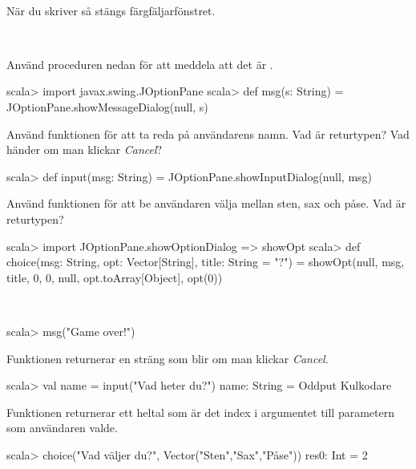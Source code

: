 \TaskSolved \what~\\När du skriver  så stängs färgfäljarfönstret.

\QUESTEND



\QUESTBEGIN

\Task\Uberkurs \what~

\Subtask Använd proceduren  nedan för att meddela att det är .
\begin{REPL}
scala> import javax.swing.JOptionPane
scala> def msg(s: String) = JOptionPane.showMessageDialog(null, s)
\end{REPL}

\Subtask Använd funktionen  för att ta reda på användarens namn. Vad är returtypen? Vad händer om man klickar \emph{Cancel}?
\begin{REPL}
scala> def input(msg: String) = JOptionPane.showInputDialog(null, msg)
\end{REPL}

\Subtask Använd funktionen  för att be användaren välja mellan sten, sax och påse. Vad är returtypen?
\begin{REPL}
scala> import JOptionPane.{showOptionDialog => showOpt}
scala> def choice(msg: String, opt: Vector[String], title: String = "?") =
  showOpt(null, msg, title, 0, 0, null, opt.toArray[Object], opt(0))
\end{REPL}


\SOLUTION

\TaskSolved \what~

\SubtaskSolved
\begin{REPL}
scala> msg("Game over!")
\end{REPL}

\SubtaskSolved Funktionen  returnerar en sträng som blir  om man klickar \emph{Cancel}.
\begin{REPL}
scala> val name = input("Vad heter du?")
name: String = Oddput Kulkodare
\end{REPL}

\SubtaskSolved Funktionen  returnerar ett heltal som är det index i argumentet till parametern  som användaren valde.
\begin{REPL}
scala> choice("Vad väljer du?", Vector("Sten","Sax","Påse"))
res0: Int = 2
\end{REPL}

\QUESTEND




